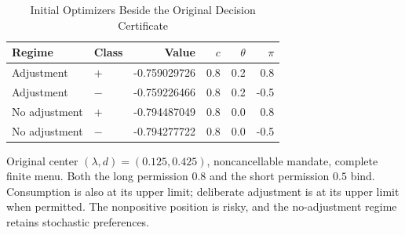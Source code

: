 \begin{table}[tbp]
\centering\small
\caption{Initial Optimizers Beside the Original Decision Certificate}
\label{tab:r9_initial}
\begin{tabular}{llrrrr}
\toprule
Regime & Class & Value & $c$ & $\theta$ & $\pi$ \\
\midrule
Adjustment & $+$ & -0.759029726 & 0.8 & 0.2 & 0.8 \\
Adjustment & $-$ & -0.759226466 & 0.8 & 0.2 & -0.5 \\
No adjustment & $+$ & -0.794487049 & 0.8 & 0.0 & 0.8 \\
No adjustment & $-$ & -0.794277722 & 0.8 & 0.0 & -0.5 \\
\bottomrule
\end{tabular}
\begin{minipage}{0.98\textwidth}\footnotesize\medskip
Original center $(\lambda,d)=(0.125,0.425)$, noncancellable mandate, complete finite menu. Both the long permission $0.8$ and the short permission $0.5$ bind. Consumption is also at its upper limit; deliberate adjustment is at its upper limit when permitted. The nonpositive position is risky, and the no-adjustment regime retains stochastic preferences.
\end{minipage}
\end{table}
